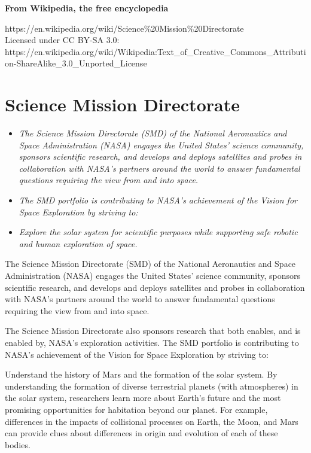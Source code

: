 \textbf{From Wikipedia, the free encyclopedia}

https://en.wikipedia.org/wiki/Science\%20Mission\%20Directorate\\
Licensed under CC BY-SA 3.0:\\
https://en.wikipedia.org/wiki/Wikipedia:Text\_of\_Creative\_Commons\_Attribution-ShareAlike\_3.0\_Unported\_License

\section{Science Mission Directorate}\label{science-mission-directorate}

\begin{itemize}
\item
  \emph{The Science Mission Directorate (SMD) of the National
  Aeronautics and Space Administration (NASA) engages the United States'
  science community, sponsors scientific research, and develops and
  deploys satellites and probes in collaboration with NASA's partners
  around the world to answer fundamental questions requiring the view
  from and into space.}
\item
  \emph{The SMD portfolio is contributing to NASA's achievement of the
  Vision for Space Exploration by striving to:}
\item
  \emph{Explore the solar system for scientific purposes while
  supporting safe robotic and human exploration of space.}
\end{itemize}

The Science Mission Directorate (SMD) of the National Aeronautics and
Space Administration (NASA) engages the United States' science
community, sponsors scientific research, and develops and deploys
satellites and probes in collaboration with NASA's partners around the
world to answer fundamental questions requiring the view from and into
space.

The Science Mission Directorate also sponsors research that both
enables, and is enabled by, NASA's exploration activities. The SMD
portfolio is contributing to NASA's achievement of the Vision for Space
Exploration by striving to:

Understand the history of Mars and the formation of the solar system. By
understanding the formation of diverse terrestrial planets (with
atmospheres) in the solar system, researchers learn more about Earth's
future and the most promising opportunities for habitation beyond our
planet. For example, differences in the impacts of collisional processes
on Earth, the Moon, and Mars can provide clues about differences in
origin and evolution of each of these bodies.

